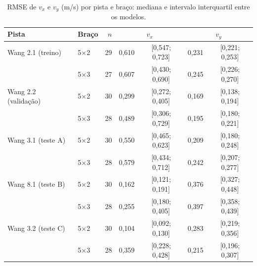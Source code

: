 \begin{table}[htbp]
    \centering
    \caption{RMSE de $v_x$ e $v_y$ (m/s) por pista e braço: mediana e intervalo interquartil entre os modelos.}
    \label{tab:resumo_vel}
    \footnotesize
    \begin{tabular}{llrcccc}
        \toprule
        \textbf{Pista} & \textbf{Braço} & $n$ & \multicolumn{2}{c}{$v_x$} & \multicolumn{2}{c}{$v_y$} \\
        \midrule
        Wang 2.1 (treino) & 5×2 & 29 & 0,610 & [0,547; 0,723] & 0,231 & [0,221; 0,253] \\
         & 5×3 & 27 & 0,607 & [0,430; 0,690] & 0,245 & [0,226; 0,270] \\
        Wang 2.2 (validação) & 5×2 & 30 & 0,299 & [0,272; 0,405] & 0,169 & [0,138; 0,194] \\
         & 5×3 & 28 & 0,489 & [0,306; 0,729] & 0,195 & [0,180; 0,221] \\
        Wang 3.1 (teste A) & 5×2 & 30 & 0,550 & [0,465; 0,623] & 0,209 & [0,180; 0,248] \\
         & 5×3 & 28 & 0,579 & [0,434; 0,712] & 0,242 & [0,207; 0,277] \\
        Wang 8.1 (teste B) & 5×2 & 30 & 0,162 & [0,121; 0,191] & 0,376 & [0,327; 0,448] \\
         & 5×3 & 28 & 0,255 & [0,180; 0,405] & 0,397 & [0,358; 0,439] \\
        Wang 3.2 (teste C) & 5×2 & 30 & 0,104 & [0,092; 0,130] & 0,283 & [0,219; 0,356] \\
         & 5×3 & 28 & 0,359 & [0,228; 0,428] & 0,215 & [0,196; 0,307] \\
        \bottomrule
    \end{tabular}
\end{table}
